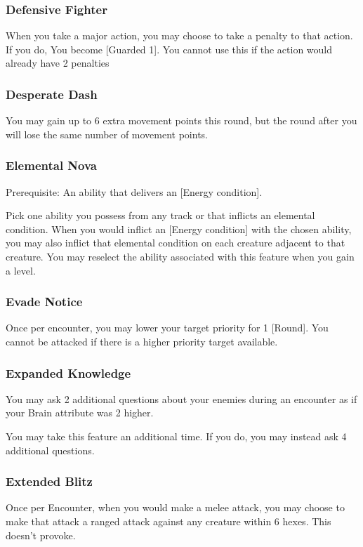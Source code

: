 \begin{multicols*}{2}
\subsubsection{Defensive Fighter}
When you take a major action, you may choose to take a penalty to that action. If you do, You become [Guarded 1]. You cannot use this if the action would already have 2 penalties

\subsubsection{Desperate Dash}
You may gain up to 6 extra movement points this round, but the round after you will lose the same number of movement points. 

\subsubsection{Elemental Nova}
Prerequisite: An ability that delivers an [Energy condition].

Pick one ability you possess from any track or \facet that inflicts an elemental condition. When you would inflict an [Energy condition] with the chosen ability, you may also inflict that elemental condition on each creature adjacent to that creature. You may reselect the ability associated with this feature when you gain a level.

\subsubsection{Evade Notice}
Once per encounter, you may lower your target priority for 1 [Round]. You cannot be attacked if there is a higher priority target available.

\subsubsection{Expanded Knowledge}
You may ask 2 additional questions about your enemies during an encounter as if your Brain attribute was 2 higher.

You may take this feature an additional time. If you do, you may instead ask 4 additional questions.

\subsubsection{Extended Blitz}
Once per Encounter, when you would make a melee attack, you may choose to make that attack a ranged attack against any creature within 6 hexes. This doesn’t provoke.


\end{multicols*}
